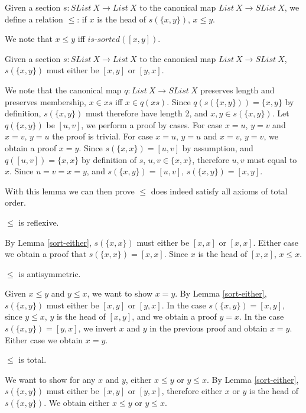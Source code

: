 \documentclass{article}
\begin{document}
\begin{mydef}
    Given a section $s : SList \: X \rightarrow List \: X$ to the canonical map $List \: X \rightarrow SList \: X$,
    we define a relation $\leq$: if $x$ is the head of $s(\{x, y\})$, $x \leq y$.
\end{mydef}

We note that $x \leq y$ iff $\textit{is-sorted}([x, y])$.

\begin{mylemma}
    \label{sort-either}
    Given a section $s : SList \: X \rightarrow List \: X$ to the canonical map $List \: X \rightarrow SList \: X$,
    $s(\{x, y\})$ must either be $[x, y]$ or $[y, x]$.
\end{mylemma}

We note that the canonical map $q : List \: X \rightarrow SList \: X$ preserves length and preserves membership, $x \in xs$ iff $x \in q(xs)$.
Since $q(s(\{x, y\})) = \{x, y\}$ by definition, $s(\{x,y\})$ must therefore have length 2, and $x, y \in s(\{x, y\})$.
Let $q(\{x, y\})$ be $[u, v]$, we perform a proof by cases. For case $x = u$, $y = v$ and $x = v$, $y = u$ the proof is trivial.
For case $x = u$, $y = u$ and $x = v$, $y = v$, we obtain a proof $x = y$. Since $s(\{x, x\}) = [u , v]$ by assumption,
and $q([u, v]) = \{x, x\}$ by definition of $s$, $u, v \in \{x, x\}$, therefore $u, v$ must equal to $x$.
Since $u = v = x = y$, and $s(\{x, y\}) = [u, v]$, $s(\{x, y\}) = [x, y]$.

With this lemma we can then prove $\leq$ does indeed satisfy all axioms of total order.

\begin{mythm}
    $\leq$ is reflexive.
\end{mythm}
By Lemma \ref{sort-either}, $s(\{x, x\})$ must either be $[x, x]$ or $[x ,x]$. Either case we obtain a proof that
$s(\{x, x\}) = [x, x]$. Since $x$ is the head of $[x, x]$, $x \leq x$.

\begin{mythm}
    $\leq$ is antisymmetric.
\end{mythm}
Given $x \leq y$ and $y \leq x$, we want to show $x = y$.
By Lemma \ref{sort-either}, $s(\{x, y\})$ must either be $[x, y]$ or $[y, x]$. In the case $s(\{x, y\}) = [x, y]$,
since $y \leq x$, $y$ is the head of $[x, y]$, and we obtain a proof $y = x$. In the case $s(\{x, y\}) = [y, x]$,
we invert $x$ and $y$ in the previous proof and obtain $x = y$. Either case we obtain $x = y$.

\begin{mythm}
    $\leq$ is total.
\end{mythm}
We want to show for any $x$ and $y$, either $x \leq y$ or $y \leq x$.
By Lemma \ref{sort-either}, $s(\{x, y\})$ must either be $[x, y]$ or $[y, x]$, therefore either $x$ or $y$
is the head of $s(\{x, y\})$. We obtain either $x \leq y$ or $y \leq x$.
\end{document}
